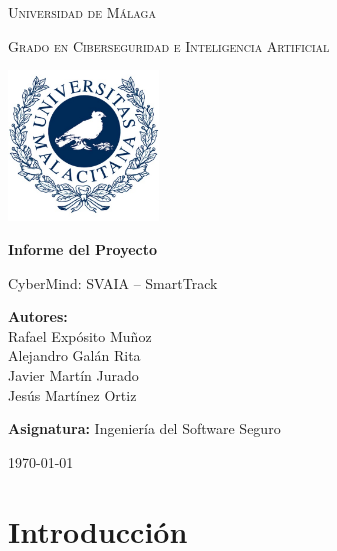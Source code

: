 \documentclass[11pt]{article}
\begin{document}

\begin{titlepage}
    \centering
    \vspace*{2cm}
    
    {\scshape\LARGE Universidad de Málaga \par}
    \vspace{0.5cm}
    {\scshape\Large Grado en Ciberseguridad e Inteligencia Artificial\par}
    \vspace{1.5cm}
    
    \includegraphics[width=0.3\textwidth]{images/uma_logo.png}\par
    \vspace{1.5cm}
    
    {\huge\bfseries Informe del Proyecto\par}
    \vspace{0.5cm}
    {\Large CyberMind: SVAIA – SmartTrack\par}
    
    \vfill
    
    \textbf{Autores:} \\
    Rafael Expósito Muñoz \\
    Alejandro Galán Rita \\
    Javier Martín Jurado \\
    Jesús Martínez Ortiz
    
    \vspace{1.5cm}
    
    \textbf{Asignatura:} Ingeniería del Software Seguro \\
    
    
    \vspace{1.5cm}
    
    {\large \today\par}
\end{titlepage}

\newpage
\tableofcontents
\newpage

\section{Introducción}
\end{document}
